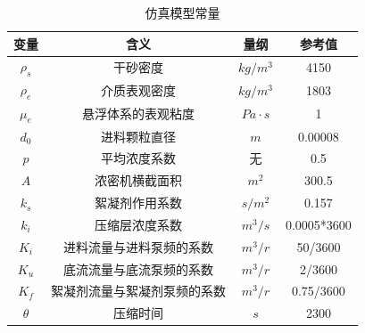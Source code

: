\begin{table}[!ht]
  \centering
\caption{仿真模型常量}
\label{tab:const_variable}
\begin{tabular}{cccc}
\toprule 变量            & 含义             & 量纲           &
参考值         \\ \midrule
$\rho _s$     & 干砂密度           & $kg/m^3$     & 4150        \\
$\rho _e$     & 介质表观密度         & $kg/m^3$     & 1803        \\
$\mu _ { e }$ & 悬浮体系的表观粘度      & $Pa \cdot s$ & 1           \\
$d_0$         & 进料颗粒直径         & $m$          & 0.00008     \\
$p$           & 平均浓度系数         & 无            & 0.5         \\
$A$           & 浓密机横截面积        & $m^2$        & 300.5       \\
$k_s$         & 絮凝剂作用系数        & $s/m^2$      & 0.157       \\
$k_i$         & 压缩层浓度系数        & $m^3/s$      & 0.0005*3600 \\
$K_i$         & 进料流量与进料泵频的系数   & $m^3/r$      & 50/3600     \\
$K_u$         & 底流流量与底流泵频的系数   & $m^3/r$      & 2/3600      \\
$K_f$         & 絮凝剂流量与絮凝剂泵频的系数 & $m^3/r$      & 0.75/3600   \\
$\theta$      & 压缩时间           & $s$          & 2300        \\
\bottomrule
\end{tabular}
\end{table}
